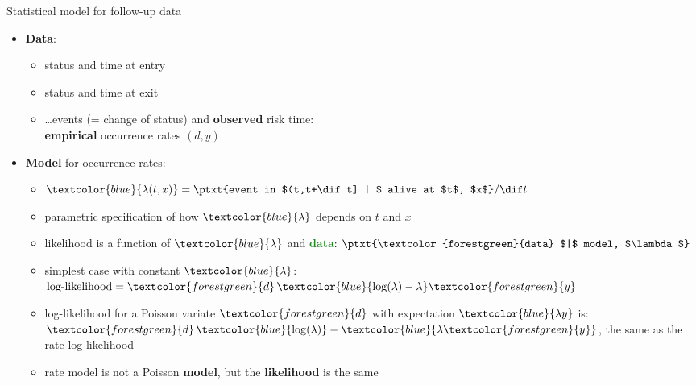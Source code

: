 \begin{frame}{Statistical model for follow-up data}
\vspace*{-1ex}
  \begin{itemize}[<+->]
  \item \textbf{Data}:

    \begin{itemize}
    \item status and time at entry
    \item status and time at exit
    \item \ldots events (= change of status) and \textbf{observed} risk time:\\
        \textbf{empirical} occurrence rates $(d, y)$
    \end{itemize}

  \item \textbf{Model} for occurrence rates:

    \begin{itemize}
    \item $\textcolor{blue}{\lambda(t, x)}
          = \ptxt{event in $(t,t+\dif t] | $ alive at $t$, $x$} / \dif t$
    \item parametric specification of how $\textcolor{blue}{\lambda}$ depends on $t$ and $x$
    \item likelihood is a function of $\textcolor{blue}{\lambda}$ and
      \textcolor{forestgreen}{\textbf{data}}: $\ptxt{\textcolor{forestgreen}{data} $|$ model, $\lambda$}$
    \item simplest case with constant $\textcolor{blue}{\lambda}$:
          $\text{log-likelihood} = \textcolor{forestgreen}{d}\,\textcolor{blue}{\log(\lambda)
            - \lambda}\textcolor{forestgreen}{y}$
    \item log-likelihood for a Poisson variate $\textcolor{forestgreen}{d}$ with expectation
  $\textcolor{blue}{\lambda y}$ is:\\
  $\textcolor{forestgreen}{d}\,\textcolor{blue}{\log(\lambda)} -
   \textcolor{blue}{\lambda \textcolor{forestgreen}{y}}$,
  the same as the rate log-likelihood
\item rate model is not a Poisson \textbf{model}, but the
  \textbf{likelihood} is the same
  \end{itemize}

  \end{itemize}
\end{frame}

